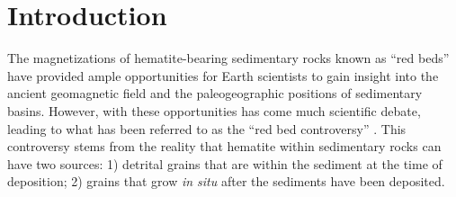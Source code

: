 \documentclass[draft]{agujournal2018}
\begin{document}

%
%
%
%


\section{Introduction}

The magnetizations of hematite-bearing sedimentary rocks known as ``red beds'' have provided ample opportunities for Earth scientists to gain insight into the ancient geomagnetic field and the paleogeographic positions of sedimentary basins. However, with these opportunities has come much scientific debate, leading to what has been referred to as the ``red bed controversy'' \citep{Butler1992a, Beck2003b, Van-Der-Voo2012a}. This controversy stems from the reality that hematite within sedimentary rocks can have two sources: 1) detrital grains that are within the sediment at the time of deposition; 2) grains that grow \textit{in situ} after the sediments have been deposited.
\end{document}
